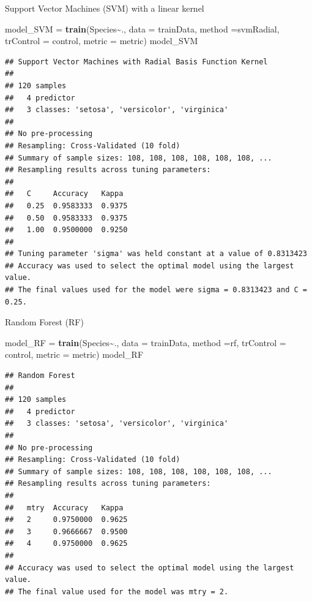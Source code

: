 \documentclass[
]{article}
\newenvironment{Shaded}{\begin{snugshade}}{\end{snugshade}}
\newcommand{\AttributeTok}[1]{\textcolor[rgb]{0.13,0.29,0.53}{#1}}
\newcommand{\FunctionTok}[1]{\textcolor[rgb]{0.13,0.29,0.53}{\textbf{#1}}}
\newcommand{\NormalTok}[1]{#1}
\newcommand{\OtherTok}[1]{\textcolor[rgb]{0.56,0.35,0.01}{#1}}
\newcommand{\SpecialCharTok}[1]{\textcolor[rgb]{0.81,0.36,0.00}{\textbf{#1}}}
\newcommand{\StringTok}[1]{\textcolor[rgb]{0.31,0.60,0.02}{#1}}
\begin{document}
Support Vector Machines (SVM) with a linear kernel

\begin{Shaded}
\begin{Highlighting}[]
\NormalTok{model\_SVM }\OtherTok{=} \FunctionTok{train}\NormalTok{(Species}\SpecialCharTok{\textasciitilde{}}\NormalTok{., }\AttributeTok{data =}\NormalTok{ trainData, }\AttributeTok{method =}\StringTok{\textquotesingle{}svmRadial\textquotesingle{}}\NormalTok{, }\AttributeTok{trControl =}\NormalTok{ control, }\AttributeTok{metric =}\NormalTok{ metric)}
\NormalTok{model\_SVM}
\end{Highlighting}
\end{Shaded}

\begin{verbatim}
## Support Vector Machines with Radial Basis Function Kernel 
## 
## 120 samples
##   4 predictor
##   3 classes: 'setosa', 'versicolor', 'virginica' 
## 
## No pre-processing
## Resampling: Cross-Validated (10 fold) 
## Summary of sample sizes: 108, 108, 108, 108, 108, 108, ... 
## Resampling results across tuning parameters:
## 
##   C     Accuracy   Kappa 
##   0.25  0.9583333  0.9375
##   0.50  0.9583333  0.9375
##   1.00  0.9500000  0.9250
## 
## Tuning parameter 'sigma' was held constant at a value of 0.8313423
## Accuracy was used to select the optimal model using the largest value.
## The final values used for the model were sigma = 0.8313423 and C = 0.25.
\end{verbatim}

Random Forest (RF)

\begin{Shaded}
\begin{Highlighting}[]
\NormalTok{model\_RF }\OtherTok{=} \FunctionTok{train}\NormalTok{(Species}\SpecialCharTok{\textasciitilde{}}\NormalTok{., }\AttributeTok{data =}\NormalTok{ trainData, }\AttributeTok{method =}\StringTok{\textquotesingle{}rf\textquotesingle{}}\NormalTok{, }\AttributeTok{trControl =}\NormalTok{ control, }\AttributeTok{metric =}\NormalTok{ metric)}
\NormalTok{model\_RF}
\end{Highlighting}
\end{Shaded}

\begin{verbatim}
## Random Forest 
## 
## 120 samples
##   4 predictor
##   3 classes: 'setosa', 'versicolor', 'virginica' 
## 
## No pre-processing
## Resampling: Cross-Validated (10 fold) 
## Summary of sample sizes: 108, 108, 108, 108, 108, 108, ... 
## Resampling results across tuning parameters:
## 
##   mtry  Accuracy   Kappa 
##   2     0.9750000  0.9625
##   3     0.9666667  0.9500
##   4     0.9750000  0.9625
## 
## Accuracy was used to select the optimal model using the largest value.
## The final value used for the model was mtry = 2.
\end{verbatim}
\end{document}
